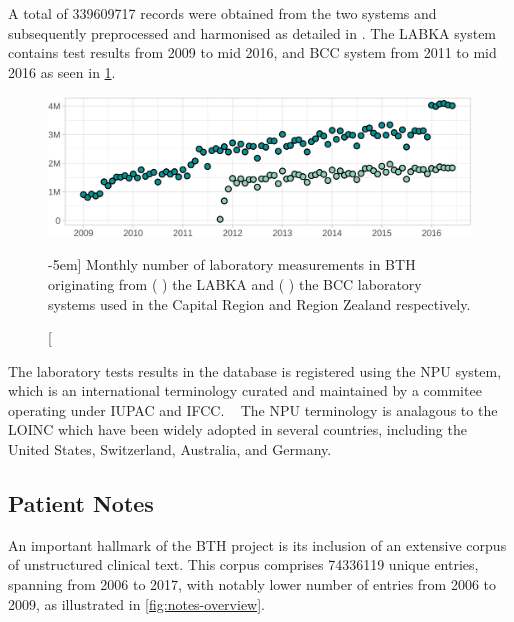 A total of \num{339609717} records were obtained from the two systems
and subsequently preprocessed and harmonised as detailed in 
\textcite{musePopulationwide2023}.
The \ac{LABKA} system contains test results from 2009 to mid 2016,
and \ac{BCC} system from 2011 to mid 2016 
as seen in \cref{fig:biochem-overview}.

\begin{figure}[b]
    \includegraphics[width=\textwidth, trim=9mm 0 0 0]{graphics/bth-biochem}
    \caption[Overview of \acs{BTH} laboratory data][-5em]{%
        Monthly number of laboratory measurements in \acf*{BTH}
        originating from 
        (\,\,) the \acs*{LABKA} and 
        (\,\,) the \acs*{BCC} laboratory systems
        used in the Capital Region and Region Zealand respectively.
    }
    \label{fig:biochem-overview}
\end{figure}%

The laboratory tests results in the database is registered using
the \ac{NPU} system, which is an international terminology
curated and maintained by a commitee operating under 
\ac{IUPAC} and \ac{IFCC}.
~\autocite{arendtExisting2020}
The \ac{NPU} terminology is analagous to the 
\ac{LOINC} which have been widely adopted in several countries,
including the United States, Switzerland, Australia, and Germany.
~\autocite{mcdonaldLOINC2003}

\subsection{Patient Notes}

An important hallmark of the \ac{BTH} project
is its inclusion of an extensive corpus of unstructured clinical text.
This corpus comprises \num{74336119} unique entries,
spanning from 2006 to 2017, 
with notably lower number of entries from 2006 to 2009,
as illustrated in \cref{fig:notes-overview}.

